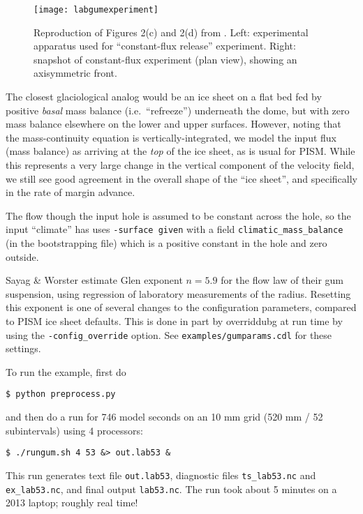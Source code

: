 \begin{figure}[ht]
\centering
\texttt{[image: labgumexperiment]}
\caption{Reproduction of Figures 2(c) and 2(d) from \cite{SayagWorster2013}.  Left: experimental  apparatus used for ``constant-flux release'' experiment.  Right: snapshot of constant-flux
experiment (plan view), showing an axisymmetric front.}
\label{fig:labgumexperiment}
\end{figure}

The closest glaciological analog would be an ice sheet on a flat bed fed by positive \emph{basal} mass balance (i.e.~``refreeze'') underneath the dome, but with zero mass balance elsewhere on the lower and upper surfaces.  However, noting that the mass-continuity equation is vertically-integrated, we model the input flux (mass balance) as arriving at the \emph{top} of the ice sheet, as is usual for PISM.  While this represents a very large change in the vertical component of the velocity field, we still see good agreement in the overall shape of the ``ice sheet'', and specifically in the rate of margin advance.

The flow though the input hole is assumed to be constant across the hole, so the input ``climate'' has uses \texttt{-surface given} with a field \texttt{climatic_mass_balance} (in the bootstrapping file) which is a positive constant in the hole and zero outside.

Sayag \& Worster estimate Glen exponent $n = 5.9$ for the flow law of their gum suspension, using regression of laboratory measurements of the radius.  Resetting this exponent is one of several changes to the configuration parameters, compared to PISM ice sheet defaults.  This is done in part by overriddubg at run time by using the \texttt{-config_override} option.  See \texttt{examples/gumparams.cdl} for these settings.

To run the example, first do
\begin{verbatim}
$ python preprocess.py
\end{verbatim}%
and then do a run for 746 model seconds \cite{SayagWorster2013} on an 10 mm grid (520 mm / 52 subintervals) using 4 processors:
\begin{verbatim}
$ ./rungum.sh 4 53 &> out.lab53 &
\end{verbatim}%
This run generates text file \texttt{out.lab53}, diagnostic files \texttt{ts_lab53.nc} and \texttt{ex_lab53.nc}, and final output \texttt{lab53.nc}.  The run took about 5 minutes on a 2013 laptop; roughly real time!

